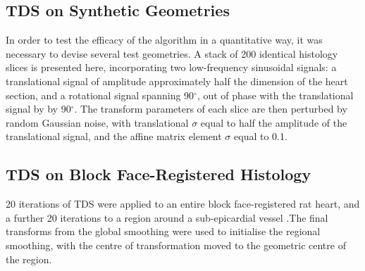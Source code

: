   \subsection{TDS on Synthetic Geometries} %
    \label{sub:tds_on_synthetic_geometries}
    In order to test the efficacy of the algorithm in a quantitative way, it was necessary to devise several test geometries. A stack of 200 identical histology slices is presented here, incorporating two low-frequency sinusoidal signals: a translational signal of amplitude approximately half the dimension of the heart section, and a rotational signal spanning 90$^{\circ}$, out of phase with the translational signal by by 90$^{\circ}$. The transform parameters of each slice are then perturbed by random Gaussian noise, with translational $\sigma$ equal to half the amplitude of the translational signal, and the affine matrix element $\sigma$ equal to 0.1.
  
  \subsection{TDS on Block Face-Registered Histology} %
    \label{sub:diffusion_on_block_face_registered_histology}
    20 iterations of TDS were applied to an entire block face-registered rat heart, and a further 20 iterations to a region around a sub-epicardial vessel .The final transforms from the global smoothing were used to initialise the regional smoothing, with the centre of transformation moved to the geometric centre of the region.
